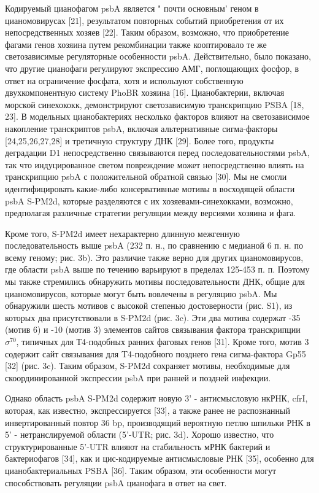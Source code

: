 \documentclass[a4paper,12pt]{article}
\begin{document}
            \par{Кодируемый цианофагом psbA является " почти основным’ геном в цианомовирусах [21], результатом
            повторных событий приобретения от их непосредственных хозяев [22]. Таким образом, возможно, что
            приобретение фагами генов хозяина путем рекомбинации также кооптировало те же светозависимые регуляторные
            особенности psbA. Действительно, было показано, что другие цианофаги регулируют экспрессию АМГ, поглощающих
            фосфор, в ответ на ограничение фосфата, хотя и используют собственную двухкомпонентную систему PhoBR
            хозяина [16]. Цианобактерии, включая морской синехококк, демонстрируют светозависимую транскрипцию PSBA
            [18, 23]. В модельных цианобактериях несколько факторов влияют на светозависимое накопление транскриптов
            psbA, включая альтернативные сигма-факторы [24,25,26,27,28] и третичную структуру ДНК [29]. Более того,
            продукты деградации D1 непосредственно связываются перед последовательностями psbA, так что индуцированное
            светом повреждение может непосредственно влиять на транскрипцию psbA с положительной обратной связью [30].
            Мы не смогли идентифицировать какие-либо консервативные мотивы в восходящей области psbA S-PM2d, которые
            разделяются с их хозяевами-синехокками, возможно, предполагая различные стратегии регуляции между версиями
            хозяина и фага.}
            \par{Кроме того, S-PM2d имеет нехарактерно длинную межгенную последовательность выше psbA (232 п. н., по
            сравнению с медианой 6 п. н. по всему геному; рис. 3b). Это различие также верно для других цианомовирусов,
            где области psbA выше по течению варьируют в пределах 125-453 п. п. Поэтому мы также стремились обнаружить
            мотивы последовательности ДНК, общие для цианомовирусов, которые могут быть вовлечены в регуляцию psbA. Мы
            обнаружили шесть мотивов с высокой степенью достоверности (рис. S1), из которых два присутствовали в S-PM2d
            (рис. 3c). Эти два мотива содержат -35 (мотив 6) и -10 (мотив 3) элементов сайтов связывания фактора
            транскрипции $\sigma^{70}$, типичных для Т4-подобных ранних фаговых генов [31]. Кроме того, мотив 3 содержит сайт
            связывания для T4-подобного позднего гена сигма-фактора Gp55 [32] (рис. 3c). Таким образом, S-PM2d
            сохраняет мотивы, необходимые для скоординированной экспрессии psbA при ранней и поздней инфекции.}
            \par{Однако область psbA S-PM2d содержит новую 3' - антисмысловую нкРНК, cfrI, которая, как известно,
            экспрессируется [33], а также ранее не распознанный инвертированный повтор 36 bp, производящий вероятную
            петлю шпильки РНК в 5' - нетранслируемой области (5'-UTR; рис. 3d). Хорошо известно, что структурированные
            5'-UTR влияют на стабильность мРНК бактерий и бактериофагов [34], как и цис-кодируемые антисмысловые РНК
            [35], особенно для цианобактериальных PSBA [36]. Таким образом, эти особенности могут способствовать
            регуляции psbA цианофага в ответ на свет.}
\end{document}
